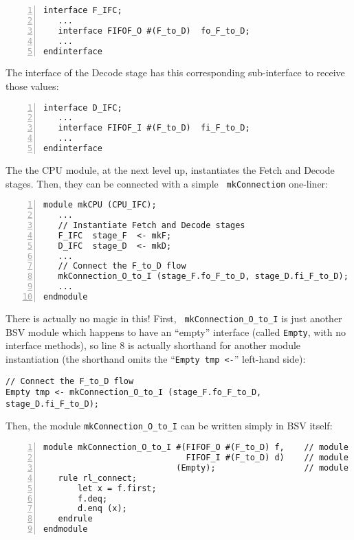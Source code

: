 {\small
\begin{Verbatim}[frame=single, numbers=left]
interface F_IFC;
   ...
   interface FIFOF_O #(F_to_D)  fo_F_to_D;
   ...
endinterface
\end{Verbatim}
}

The interface of the Decode stage has this corresponding sub-interface
to receive those values:

{\small
\begin{Verbatim}[frame=single, numbers=left]
interface D_IFC;
   ...
   interface FIFOF_I #(F_to_D)  fi_F_to_D;
   ...
endinterface
\end{Verbatim}
}

The the CPU module, at the next level up, instantiates the Fetch and
Decode stages.  Then, they can be connected with a simple {\tt
mkConnection} one-liner:

{\small
\begin{Verbatim}[frame=single, numbers=left]
module mkCPU (CPU_IFC);
   ...
   // Instantiate Fetch and Decode stages
   F_IFC  stage_F  <- mkF;
   D_IFC  stage_D  <- mkD;
   ...
   // Connect the F_to_D flow
   mkConnection_O_to_I (stage_F.fo_F_to_D, stage_D.fi_F_to_D);
   ...
endmodule
\end{Verbatim}
}

There is actually no magic in this!  First, {\tt
mkConnection\_O\_to\_I} is just another BSV module which happens to
have an ``empty'' interface (called {\tt Empty}, with no interface
methods), so line 8 is actually shorthand for another module
instantiation (the shorthand omits the ``{\tt Empty~tmp~<-}''
left-hand side):

\begin{tabbing}
\hmm\small\tt   // Connect the F\_to\_D flow \\
\hmm\small\tt   Empty tmp <- mkConnection\_O\_to\_I (stage\_F.fo\_F\_to\_D, stage\_D.fi\_F\_to\_D);
\end{tabbing}

Then, the module {\tt mkConnection\_O\_to\_I} can be written simply in BSV itself:

{\small
\begin{Verbatim}[frame=single, numbers=left]
module mkConnection_O_to_I #(FIFOF_O #(F_to_D) f,    // module argument
                             FIFOF_I #(F_to_D) d)    // module argument
                           (Empty);                  // module interface
   rule rl_connect;
       let x = f.first;
       f.deq;
       d.enq (x);
   endrule
endmodule
\end{Verbatim}
}

